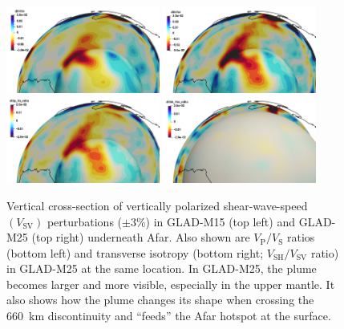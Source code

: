 \documentclass[extra,mreferee]{gji}
\begin{document}
\begin{figure}
  \centering
  \includegraphics[width=0.45\textwidth]{./figures/afar_M15_dInVsv.png}
  \includegraphics[width=0.45\textwidth]{./figures/afar_M25_dInVsv.png} \\
  \includegraphics[width=0.45\textwidth]{./figures/afar_M25_dVp_Vs_ratio.png}
  \includegraphics[width=0.45\textwidth]{./figures/afar_M25_dVsh_Vsv_ratio.png}
  \caption{\small{Vertical cross-section of vertically polarized shear-wave-speed $(V_\textrm{SV})$ perturbations ($\pm3$\%) in GLAD-M15 (top left) and GLAD-M25 (top right) underneath Afar. Also shown are $V_\textrm{P}/V_\textrm{S}$ ratios (bottom left) and transverse isotropy (bottom right; $V_\textrm{SH}/V_\textrm{SV}$ ratio) in GLAD-M25 at the same location. In GLAD-M25, the plume becomes larger and more visible, especially in the upper mantle. It also shows how the plume changes its shape when crossing the 660~km discontinuity and ``feeds'' the Afar hotspot at the surface.}}
  \label{fig:M25-AFAR}
\end{figure}
\end{document}
